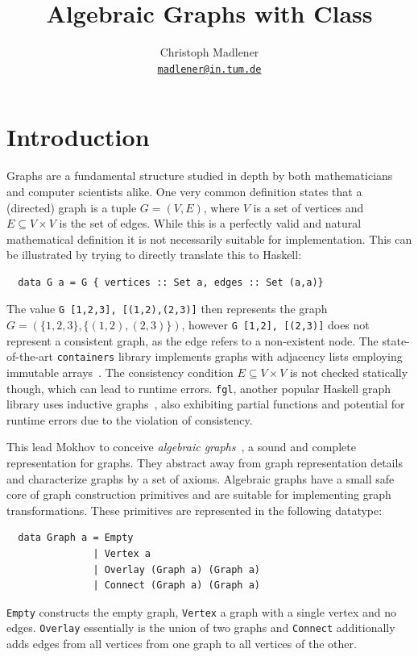 \documentclass{article}
\title{Algebraic Graphs with Class}
\author{
  Christoph Madlener\\
  \texttt{\href{mailto:madlener@in.tum.de}{madlener@in.tum.de}}
}
\newcommand{\hs}{\texttt}
\begin{document}
\maketitle
\begin{abstract}
  \cite{mokhov2017algebraic} 
\end{abstract}

\section{Introduction}\label{sec:intro}
Graphs are a fundamental structure studied in depth by both mathematicians and
computer scientists alike. One very common definition states that a (directed)
graph is a tuple $G = (V,E)$, where $V$ is a set of vertices and $E \subseteq V
\times V$ is the set of edges. While this is a perfectly valid and natural
mathematical definition it is not necessarily suitable for implementation. This
can be illustrated by trying to directly translate this to Haskell:
\begin{verbatim}
  data G a = G { vertices :: Set a, edges :: Set (a,a)}
\end{verbatim}
The value \hs{G {[1,2,3], [(1,2),(2,3)]}} then represents the graph $G =
(\{1,2,3\}, \{(1,2),(2,3)\})$, however \hs{G {[1,2], [(2,3)]}} does not
represent a consistent graph, as the edge refers to a non-existent node.
The state-of-the-art \texttt{containers} library implements graphs with
adjacency lists employing immutable arrays~\cite{king1995dfs}. The
consistency condition $E \subseteq V \times V$ is not checked statically though,
which can lead to runtime errors. \texttt{fgl}, another popular Haskell graph
library uses inductive graphs~\cite{erwig2001inductive}, also exhibiting partial
functions and potential for runtime errors due to the violation of consistency.

This lead Mokhov to conceive \textit{algebraic
  graphs}~\cite{mokhov2017algebraic}, a sound and complete representation for
graphs. They abstract away from graph representation details and characterize
graphs by a set of axioms. Algebraic graphs have a small safe core of graph
construction primitives and are suitable for implementing graph transformations.
These primitives are represented in the following datatype:
\begin{verbatim}
  data Graph a = Empty
               | Vertex a
               | Overlay (Graph a) (Graph a)
               | Connect (Graph a) (Graph a)
\end{verbatim}
\hs{Empty} constructs the empty graph, \hs{Vertex} a graph with a single vertex
and no edges. \hs{Overlay} essentially is the union of two graphs and
\hs{Connect} additionally adds edges from all vertices from one graph to all
vertices of the other.
\end{document}
